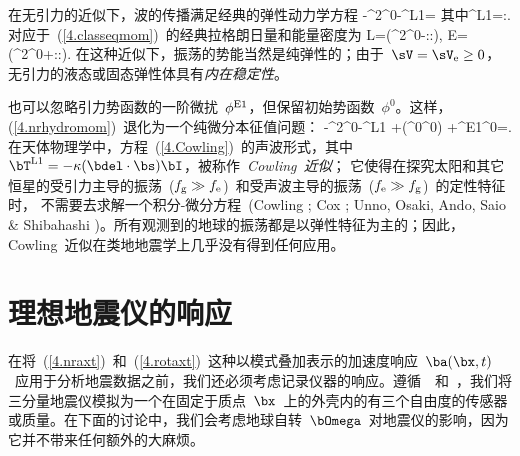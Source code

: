 {在无引力的近似下，波的传播满足经典的弹性动力学方程
\eq \label{4.classeqmom}
-\omega^2\rho^0\bs-\bdel\cdot\bT^{\rm L1}=\bzero\quad
\mbox{其中}\quad\bT^{\rm L1}=\bGamma\!:\!\beps.
\en
对应于~(\ref{4.classeqmom})~的经典拉格朗日量和能量密度为
\eq \label{4.classLE}
L=\half(\om^2\rho^0\bs\cdot\bs-\beps\!:\!\bGamma\!:\!\beps),\qquad
E=\half(\om^2\rho^0\bs\cdot\bs+\beps\!:\!\bGamma\!:\!\beps).
\en
在这种近似下，振荡的势能当然是纯弹性的；由于~$\sV=\sV_{\rm e}\geq 0$，无引力的液态或固态弹性体具有{\em 内在稳定性\/}。
%

也可以忽略引力势函数的一阶微扰~$\phi^{\rm E1}$，但保留初始势函数~$\phi^0$。这样，(\ref{4.nrhydromom})~退化为一个纯微分本征值问题：
\eq \label{4.Cowling}
-\omega^2\rho^0\bs-\bdel\cdot\bT^{\rm L1}
+\bdel(\rho^0\bs\cdot\bdel\phi^0)
+\rho^{\rm E1}\bdel\phi^0=\bzero.
\en
在天体物理学中，方程~(\ref{4.Cowling})~的声波形式，其中~$\bT^{\rm L1}=-\kappa(\bdel\cdot\bs)\bI$，被称作~{\em Cowling~近似\/}；
%
它使得在探究太阳和其它恒星的受引力主导的振荡~($f_{\rm g}\gg f_{\rm e}$)~和受声波主导的振荡~($f_{\rm e}\gg f_{\rm g}$)~的定性特征时，
%
%
不需要去求解一个积分-微分方程~(Cowling \citeyear{cowling41}; Cox \citeyear{cox80}; Unno, Osaki, Ando, Saio \& Shibahashi \citeyear{unno&al89})。所有观测到的地球的振荡都是以弹性特征为主的；因此，Cowling~近似在类地地震学上几乎没有得到任何应用。
%
%

\renewcommand{\thesection}{$\!\!\!\raise1.3ex\hbox{$\star$}\!\!$
\arabic{chapter}.\arabic{section}}
\section{理想地震仪的响应}
%
%
%
\label{4.sec.accel}
\renewcommand{\thesection}{\arabic{chapter}.\arabic{section}}

在将~(\ref{4.nraxt})~和~(\ref{4.rotaxt})~这种以模式叠加表示的加速度响应~$\ba(\bx,t)$~应用于分析地震数据之前，我们还必须考虑记录仪器的响应。遵循~\textcite{gilbert80}~和~\textcite{wahr81b}，我们将三分量地震仪模拟为一个在固定于质点~$\bx$~上的外壳内的有三个自由度的传感器或质量。在下面的讨论中，我们会考虑地球自转~$\bOmega$~对地震仪的影响，因为它并不带来任何额外的大麻烦。

}
